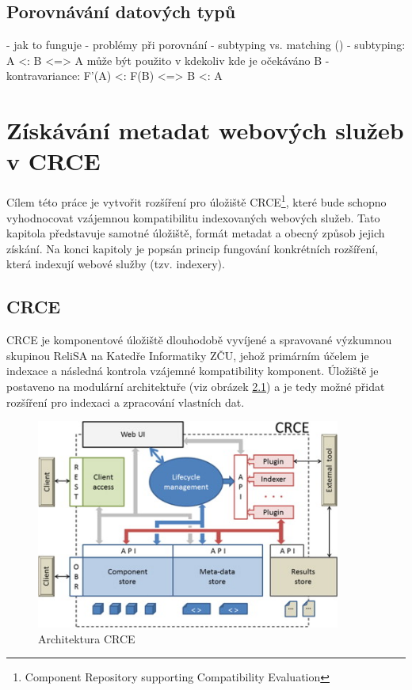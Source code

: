 \documentclass[czech,DP]{thesiskiv}
\begin{document}
\section{Porovnávání datových typů}

 - jak to funguje
 - problémy při porovnání
 - subtyping vs. matching (\cite{abadi1995subytping})
 - subtyping: A <: B <=> A může být použito v kdekoliv kde je očekáváno B
 - kontravariance: F'(A) <: F(B) <=> B <: A


\chapter{Získávání metadat webových služeb v CRCE}
\label{sec:crce}

Cílem této práce je vytvořit rozšíření pro úložiště CRCE\footnote{Component Repository supporting Compatibility Evaluation}, které bude schopno vyhodnocovat vzájemnou kompatibilitu indexovaných webových služeb. Tato kapitola představuje samotné úložiště, formát metadat a obecný způsob jejich získání. Na konci kapitoly je popsán princip fungování konkrétních rozšíření, která indexují webové služby (tzv. indexery).

\section{CRCE}

CRCE je komponentové úložiště dlouhodobě vyvíjené a spravované výzkumnou skupinou ReliSA na Katedře Informatiky ZČU, jehož primárním účelem je indexace a následná kontrola vzájemné kompatibility komponent. Úložiště je postaveno na modulární architektuře (viz obrázek \ref{fig:crce-arch}) a je tedy možné přidat rozšíření pro indexaci a zpracování vlastních dat.

\begin{figure}[h]
	\centering
	\includegraphics[width=10cm]{crce-arch.jpg}
	\caption{Architektura CRCE}
	\label{fig:crce-arch}
\end{figure} 
\end{document}
